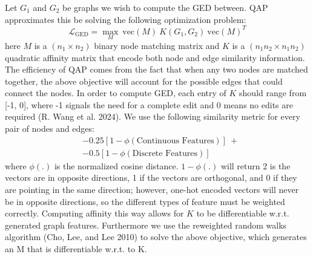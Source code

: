 \documentclass[
  11pt,
  letterpaper,
]{article}
\begin{document}
Let \(G_1\) and \(G_2\) be graphs we wish to compute the GED between.
QAP approximates this be solving the following optimization problem:
\begin{equation}
    \mathcal{L}_{\text{GED}} = \underset{M}{\max} \ \text{vec}(M) \ K(G_1, G_2) \ \text{vec}(M)^T
\end{equation} here \(M\) is a \((n_1 \times n_2)\) binary node matching
matrix and \(K\) is a \((n_1 n_2 \times n_1 n_2)\) quadratic affinity
matrix that encode both node and edge similarity information. The
efficiency of QAP comes from the fact that when any two nodes are
matched together, the above objective will account for the possible
edges that could connect the nodes. In order to compute GED, each entry
of \(K\) should range from {[}-1, 0{]}, where -1 signals the need for a
complete edit and 0 means no edits are required (R. Wang et al. 2024).
We use the following similarity metric for every pair of nodes and
edges: \begin{equation}
    \begin{split}
         &-0.25 \left[ 1 - \phi(\text{Continuous Features}) \right] \ + \\
         &-0.5 \left[1 - \phi(\text{Discrete Features}) \right]
    \end{split}
\end{equation} where \(\phi(.)\) is the normalized cosine distance.
\(1 - \phi(.)\) will return 2 is the vectors are in opposite directions,
1 if the vectors are orthogonal, and 0 if they are pointing in the same
direction; however, one-hot encoded vectors will never be in opposite
directions, so the different types of feature must be weighted
correctly. Computing affinity this way allows for \(K\) to be
differentiable w.r.t. generated graph features. Furthermore we use the
reweighted random walks algorithm (Cho, Lee, and Lee 2010) to solve the
above objective, which generates an M that is differentiable w.r.t. to
K.
\end{document}
